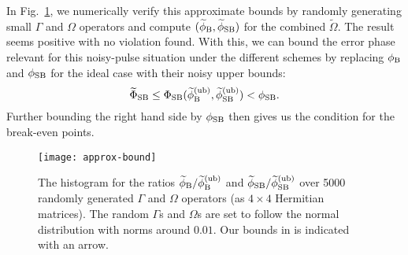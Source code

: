 \documentclass[pra,reprint,superscriptaddress]{revtex4-2}
\newcommand{\wtO}{\widetilde{\Omega}}
\begin{document}
In Fig.~\ref{fig:approx-bound}, we numerically verify this approximate bounds by randomly generating small $\Gamma$ and $\Omega$ operators and compute $(\widetilde\phi_{\mathrm{B}},\widetilde{\phi}_{\mathrm{SB}})$ for the combined $\wtO$.
The result seems positive with no violation found.
With this, we can bound the error phase relevant for this noisy-pulse situation under the different schemes by replacing $\phi_{\mathrm{B}}$ and $\phi_{\mathrm{SB}}$ for the ideal case with their noisy upper bounds: 
\begin{equation}
 \widetilde\Phi_{\mathrm{SB}} \le \Phi_{\mathrm{SB}}(\widetilde\phi_{\mathrm{B}}^{(\mathrm{ub})}  ,\widetilde\phi_{\mathrm{SB}}^{(\mathrm{ub})} ) < \phi_{\mathrm{SB}}.
\end{equation}
Further bounding the right hand side by $\phi_{\mathrm{SB}}$ then gives us the condition for the break-even points.

\begin{figure}[htbp]
 \centering
 \texttt{[image: approx-bound]}
 \caption{The histogram for the ratios $\widetilde\phi_{\mathrm{B}}/\widetilde\phi_{\mathrm{B}}^{(\mathrm{ub})}$ and $\widetilde\phi_{\mathrm{SB}}/\widetilde\phi_{\mathrm{SB}}^{(\mathrm{ub})}$ over 5000 randomly generated $\Gamma$ and $\Omega$ operators (as $4\times 4$ Hermitian matrices). The random $\Gamma$s and $\Omega$s are set to follow  the normal distribution with norms around $0.01$. Our bounds in  is indicated with an arrow.}
 \label{fig:approx-bound}
\end{figure}
\end{document}

